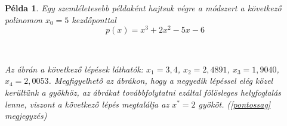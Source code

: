 \documentclass[a4paper,12pt]{report}
\newtheorem{Pl}[Tet]{Példa}
\begin{document}
			\begin{Pl}
				Egy szemléletesebb példaként hajtsuk végre a módszert a következő polinomon $x_0=5$ kezdőponttal
				\[p(x)=x^3+2x^2-5x-6\]
				
				\begin{figure}[ht]
					\centering
					\hspace{3mm} %
					\\
					\hspace{3mm} %
				\end{figure}
				
				Az ábrán a következő lépések láthatók: $x_1=3,\!4$, $x_2=2,\!4891$, $x_3=1,\!9040$, $x_4=2,\!0053$. Megfigyelhető az ábrákon, hogy a negyedik lépéssel elég közel kerültünk a gyökhöz, az ábrákat továbbfolytatni ezáltal fölösleges helyfoglalás lenne, viszont a következő lépés megtalálja az $x^*=2$ gyököt. (\ref{pontossag} megjegyzés)
			\end{Pl}
\end{document}
